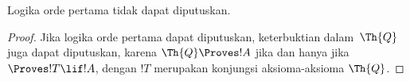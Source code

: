 \documentclass[../../../include/open-logic-section]{subfiles}
\begin{document}
\begin{cor}
Logika orde pertama tidak dapat diputuskan.
\end{cor}

\begin{proof}
Jika logika orde pertama dapat diputuskan, keterbuktian dalam~$\Th{Q}$ juga
dapat diputuskan, karena $\Th{Q} \Proves !A$ jika dan hanya jika
$\Proves !T \lif !A$, dengan $!T$ merupakan konjungsi aksioma-aksioma
$\Th{Q}$.
\end{proof}
\end{document}
